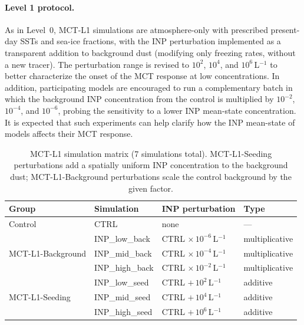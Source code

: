 \paragraph{Level 1 protocol.}
As in Level~0, MCT-L1 simulations are atmosphere-only with prescribed
present-day SSTs and sea-ice fractions, with the INP perturbation implemented
as a transparent addition to background dust (modifying only freezing rates,
without a new tracer).
The perturbation range is revised to $10^2$, $10^4$, and
$10^6$\,L$^{-1}$ to better characterize the onset of the MCT response at low
concentrations.
In addition, participating models are encouraged to run a complementary batch
in which the background INP concentration from the control is multiplied by
$10^{-2}$, $10^{-4}$, and $10^{-6}$, probing the sensitivity to a lower INP
mean-state concentration.
It is expected that such experiments can help clarify how the INP mean-state
of models affects their MCT response.
\begin{table}[h]
\centering
\footnotesize
\begin{tabular}{llll}
\hline
\textbf{Group} & \textbf{Simulation} & \textbf{INP perturbation} & \textbf{Type} \\
\hline
Control        & CTRL                & none                                      & —              \\
\hline
\multirow{3}{*}{MCT-L1-Background}
               & INP\_low\_back      & CTRL $\times\,10^{-6}$\,L$^{-1}$        & multiplicative \\
               & INP\_mid\_back      & CTRL $\times\,10^{-4}$\,L$^{-1}$        & multiplicative \\
               & INP\_high\_back     & CTRL $\times\,10^{-2}$\,L$^{-1}$        & multiplicative \\
\hline
\multirow{3}{*}{MCT-L1-Seeding}
               & INP\_low\_seed      & CTRL $+\,10^{2}$\,L$^{-1}$              & additive       \\
               & INP\_mid\_seed      & CTRL $+\,10^{4}$\,L$^{-1}$              & additive       \\
               & INP\_high\_seed     & CTRL $+\,10^{6}$\,L$^{-1}$              & additive       \\
\hline
\end{tabular}
\caption{MCT-L1 simulation matrix (7 simulations total). MCT-L1-Seeding
perturbations add a spatially uniform INP concentration to the background dust;
MCT-L1-Background perturbations scale the control background by the given factor.}
\label{tab:mct_l1_sims}
\end{table}

